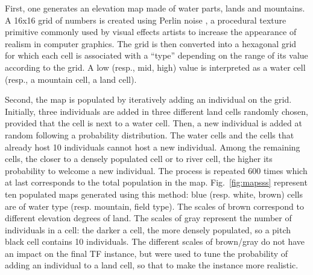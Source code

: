 \documentclass[conference]{IEEEtran}
\theoremstyle{definition}
\begin{document}
First, one generates an elevation map made of water parts, lands and mountains. 
A 16x16 grid of numbers is created using
Perlin noise \cite{perlin}, a procedural texture primitive commonly used by visual 
effects artists to increase the appearance of realism in
computer graphics. The grid is then converted into a hexagonal grid for which each cell is associated with
a ``type'' depending on the range of its value according to the grid.
A low (resp., mid, high) value is interpreted as a water cell (resp., a mountain cell, a land cell).

Second, the map is populated by iteratively adding an individual on the grid. 
Initially, three individuals are added in three different land cells randomly chosen,
provided that the cell is next to a water cell. Then, a new individual is added at 
random following a probability distribution.
The water cells and the cells that already host 10 individuals cannot host a new individual.
Among the remaining cells, the closer to a densely populated cell or to river cell,
the higher its probability to welcome a new individual.
The process is repeated 600 times which at last corresponds to the total 
population in the map.
Fig.~\ref{fig:mapsss} represent ten populated maps
generated using
this method: blue (resp. white, brown) cells are of water type (resp. mountain, field type).
The scales of brown correspond to different elevation degrees of land.
The scales of gray represent the number of individuals in a cell: the darker a cell,
the more densely populated, so a pitch black cell contains 10 individuals.
The different scales of brown/gray do not have an impact on the final TF instance, but were
used to tune the probability of adding an individual to a land cell, so that to make the instance more realistic.
\end{document}
